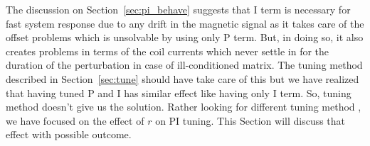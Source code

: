 The discussion on Section~\ref{sec:pi_behave} suggests that I term
is necessary for fast system response due to any drift in the magnetic
signal as it takes care of the offset problems which is unsolvable by
using only P term. But, in doing so, it also creates problems in terms
of the coil currents which never settle in for the duration of the
perturbation in case of ill-conditioned matrix. The tuning method
described in Section~\ref{sec:tune} should have take care of this but
we have realized that having tuned P and I has similar effect like
having only I term. So, tuning method doesn't give us the
solution. Rather looking for different tuning method , we have focused
on the effect of $r$ on PI tuning. This Section will discuss that
effect with possible outcome.




